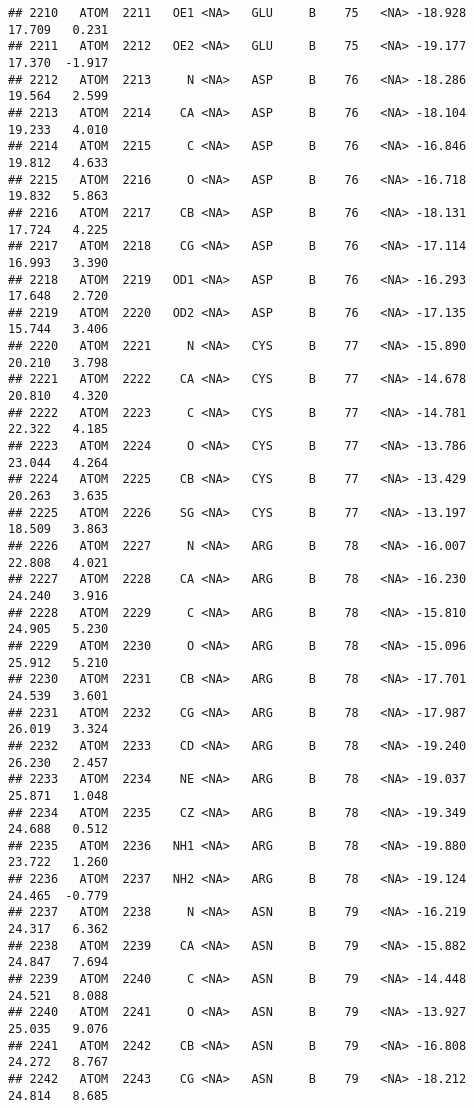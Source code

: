 \documentclass[
]{article}
\begin{document}
\begin{verbatim}
## 2210   ATOM  2211   OE1 <NA>   GLU     B    75   <NA> -18.928  17.709   0.231
## 2211   ATOM  2212   OE2 <NA>   GLU     B    75   <NA> -19.177  17.370  -1.917
## 2212   ATOM  2213     N <NA>   ASP     B    76   <NA> -18.286  19.564   2.599
## 2213   ATOM  2214    CA <NA>   ASP     B    76   <NA> -18.104  19.233   4.010
## 2214   ATOM  2215     C <NA>   ASP     B    76   <NA> -16.846  19.812   4.633
## 2215   ATOM  2216     O <NA>   ASP     B    76   <NA> -16.718  19.832   5.863
## 2216   ATOM  2217    CB <NA>   ASP     B    76   <NA> -18.131  17.724   4.225
## 2217   ATOM  2218    CG <NA>   ASP     B    76   <NA> -17.114  16.993   3.390
## 2218   ATOM  2219   OD1 <NA>   ASP     B    76   <NA> -16.293  17.648   2.720
## 2219   ATOM  2220   OD2 <NA>   ASP     B    76   <NA> -17.135  15.744   3.406
## 2220   ATOM  2221     N <NA>   CYS     B    77   <NA> -15.890  20.210   3.798
## 2221   ATOM  2222    CA <NA>   CYS     B    77   <NA> -14.678  20.810   4.320
## 2222   ATOM  2223     C <NA>   CYS     B    77   <NA> -14.781  22.322   4.185
## 2223   ATOM  2224     O <NA>   CYS     B    77   <NA> -13.786  23.044   4.264
## 2224   ATOM  2225    CB <NA>   CYS     B    77   <NA> -13.429  20.263   3.635
## 2225   ATOM  2226    SG <NA>   CYS     B    77   <NA> -13.197  18.509   3.863
## 2226   ATOM  2227     N <NA>   ARG     B    78   <NA> -16.007  22.808   4.021
## 2227   ATOM  2228    CA <NA>   ARG     B    78   <NA> -16.230  24.240   3.916
## 2228   ATOM  2229     C <NA>   ARG     B    78   <NA> -15.810  24.905   5.230
## 2229   ATOM  2230     O <NA>   ARG     B    78   <NA> -15.096  25.912   5.210
## 2230   ATOM  2231    CB <NA>   ARG     B    78   <NA> -17.701  24.539   3.601
## 2231   ATOM  2232    CG <NA>   ARG     B    78   <NA> -17.987  26.019   3.324
## 2232   ATOM  2233    CD <NA>   ARG     B    78   <NA> -19.240  26.230   2.457
## 2233   ATOM  2234    NE <NA>   ARG     B    78   <NA> -19.037  25.871   1.048
## 2234   ATOM  2235    CZ <NA>   ARG     B    78   <NA> -19.349  24.688   0.512
## 2235   ATOM  2236   NH1 <NA>   ARG     B    78   <NA> -19.880  23.722   1.260
## 2236   ATOM  2237   NH2 <NA>   ARG     B    78   <NA> -19.124  24.465  -0.779
## 2237   ATOM  2238     N <NA>   ASN     B    79   <NA> -16.219  24.317   6.362
## 2238   ATOM  2239    CA <NA>   ASN     B    79   <NA> -15.882  24.847   7.694
## 2239   ATOM  2240     C <NA>   ASN     B    79   <NA> -14.448  24.521   8.088
## 2240   ATOM  2241     O <NA>   ASN     B    79   <NA> -13.927  25.035   9.076
## 2241   ATOM  2242    CB <NA>   ASN     B    79   <NA> -16.808  24.272   8.767
## 2242   ATOM  2243    CG <NA>   ASN     B    79   <NA> -18.212  24.814   8.685

\end{verbatim}
\end{document}
